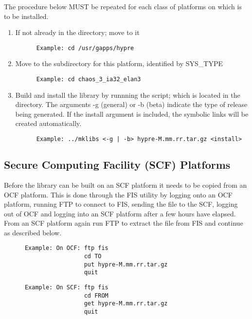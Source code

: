 The procedure below MUST be repeated for each class of platforms on which \hypre{} is 
to be installed. 

\begin{enumerate}
\item If not already in the  directory; move to it
\begin{verbatim}
      Example: cd /usr/gapps/hypre
\end{verbatim}
\item Move to the subdirectory for this platform, identified by SYS\_TYPE
\begin{verbatim}
      Example: cd chaos_3_ia32_elan3
\end{verbatim}
\item Build and install the library by runnning the  script; which is
         located in the  directory.
      The arguments -g (general) or -b (beta) indicate the type of release being 
          generated.  If the install argument is included, the symbolic links will 
          be created automatically.
\begin{verbatim}
      Example: ../mklibs <-g | -b> hypre-M.mm.rr.tar.gz <install>
\end{verbatim}
\end{enumerate}

\subsection{Secure Computing Facility (SCF) Platforms}
\label{Secure Computing Facility (SCF) Platforms}

Before the \hypre{} library can be built on an SCF platform it needs to be 
copied from an OCF platform.  This is done through the FIS utility by logging
onto an OCF platform, running FTP to connect to FIS, sending the file to the SCF, 
logging out of OCF and logging into an SCF platform after a few hours have elapsed.
From an SCF platform again run FTP to extract the file from FIS and continue as
described below.
\begin{verbatim}
      Example: On OCF: ftp fis
                       cd TO
                       put hypre-M.mm.rr.tar.gz
                       quit
\end{verbatim}

\begin{verbatim}
      Example: On SCF: ftp fis
                       cd FROM
                       get hypre-M.mm.rr.tar.gz
                       quit
\end{verbatim}

